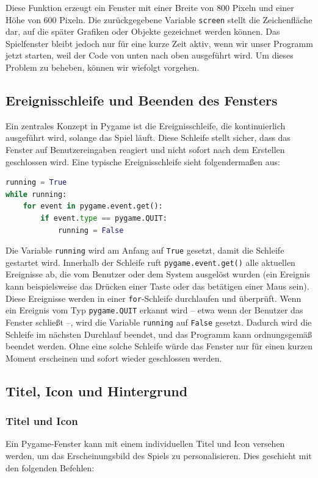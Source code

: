 \documentclass{article}
\begin{document}
Diese Funktion erzeugt ein Fenster mit einer Breite von 800 Pixeln und einer Höhe von 600 Pixeln. Die zurückgegebene Variable \texttt{screen} stellt die Zeichenfläche dar, auf die später Grafiken oder Objekte gezeichnet werden können. Das Spielfenster bleibt jedoch nur für eine kurze Zeit aktiv, wenn wir unser Programm jetzt starten, weil der Code von unten nach oben ausgeführt wird. Um dieses Problem zu beheben, können wir wiefolgt vorgehen. 

\subsection{Ereignisschleife und Beenden des Fensters}
Ein zentrales Konzept in Pygame ist die Ereignisschleife, die kontinuierlich ausgeführt wird, solange das Spiel läuft. Diese Schleife stellt sicher, dass das Fenster auf Benutzereingaben reagiert und nicht sofort nach dem Erstellen geschlossen wird. Eine typische Ereignisschleife sieht folgendermaßen aus:
\begin{lstlisting}[style=pythonstyle, language=Python]
running = True
while running:
    for event in pygame.event.get():
        if event.type == pygame.QUIT:
            running = False
\end{lstlisting}

Die Variable \texttt{running} wird am Anfang auf \texttt{True} gesetzt, damit die Schleife gestartet wird. Innerhalb der Schleife ruft \texttt{pygame.event.get()} alle aktuellen Ereignisse ab, die vom Benutzer oder dem System ausgelöst wurden (ein Ereignis kann beispielsweise das Drücken einer Taste oder das betätigen einer Maus sein). Diese Ereignisse werden in einer \texttt{for}-Schleife durchlaufen und überprüft. Wenn ein Ereignis vom Typ \texttt{pygame.QUIT} erkannt wird – etwa wenn der Benutzer das Fenster schließt –, wird die Variable \texttt{running} auf \texttt{False} gesetzt. Dadurch wird die Schleife im nächsten Durchlauf beendet, und das Programm kann ordnungsgemäß beendet werden. Ohne eine solche Schleife würde das Fenster nur für einen kurzen Moment erscheinen und sofort wieder geschlossen werden.

\subsection{Titel, Icon und Hintergrund}
\subsubsection{Titel und Icon}
Ein Pygame-Fenster kann mit einem individuellen Titel und Icon versehen werden, um das Erscheinungsbild des Spiels zu personalisieren. Dies geschieht mit den folgenden Befehlen:
\end{document}
